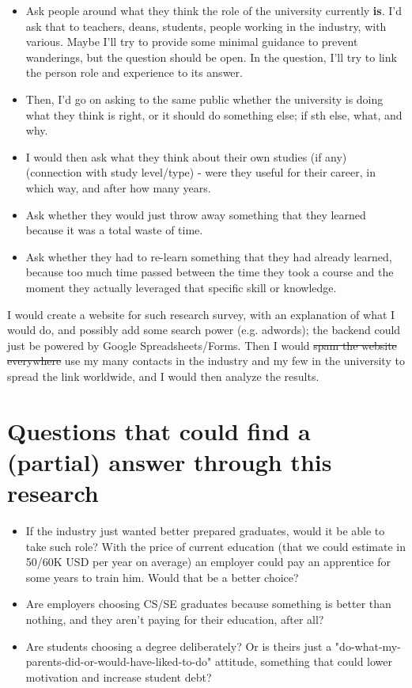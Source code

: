 \documentclass[12pt,a4paper,titlepage]{article}
\begin{document}
\begin{itemize}
\item Ask people around what they think the role of the university currently \textbf{is}. I'd ask that to teachers, deans, students, people working in the industry, with various. Maybe I'll try to provide some minimal guidance to prevent wanderings, but the question should be open. In the question, I'll try to link the person role and experience to its answer.
\item Then, I'd go on asking to the same public whether the university is doing what they think is right, or it should do something else; if sth else, what, and why.
\item I would then ask what they think about their own studies (if any) (connection with study level/type) - were they useful for their career, in which way, and after how many years.
\item Ask whether they would just throw away something that they learned because it was a total waste of time.
\item Ask whether they had to re-learn something that they had already learned, because too much time passed between the time they took a course and the moment they actually leveraged that specific skill or knowledge.
\end{itemize}

I would create a website for such research survey, with an explanation of what I would do, and possibly add some search power (e.g. adwords); the backend could just be powered by Google Spreadsheets/Forms. Then I would \sout{spam the website everywhere} use my many contacts in the industry and my few in the university to spread the link worldwide, and I would then analyze the results.

\section*{Questions that could find a (partial) answer through this research}
\begin{itemize}
	\item If the industry just wanted better prepared graduates, would it be able to take such role? With the price of current education (that we could estimate in 50/60K USD per year on average) an employer could pay an apprentice for some years to train him. Would that be a better choice?
	\item Are employers choosing CS/SE graduates because something is better than nothing, and they aren't paying for their education, after all?
	\item Are students choosing a degree deliberately? Or is theirs just a "do-what-my-parents-did-or-would-have-liked-to-do" attitude, something that could lower motivation and increase student debt?
\end{itemize}



{}

\end{document}
